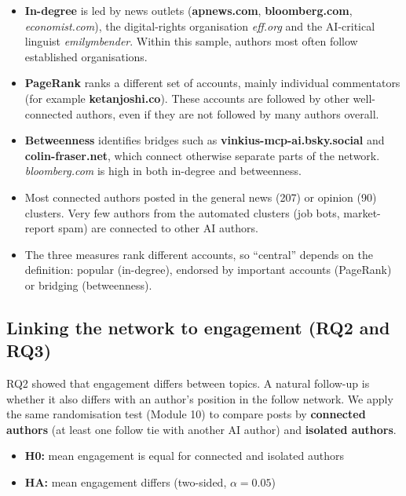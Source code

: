 \documentclass[
  10pt,
]{article}
\providecommand{\tightlist}{%
  \setlength{\itemsep}{0pt}\setlength{\parskip}{0pt}}
\begin{document}
\begin{itemize}
\tightlist
\item
  \textbf{In-degree} is led by news outlets (\textbf{apnews.com},
  \textbf{bloomberg.com}, \emph{economist.com}), the digital-rights
  organisation \emph{eff.org} and the AI-critical linguist
  \emph{emilymbender}. Within this sample, authors most often follow
  established organisations.
\item
  \textbf{PageRank} ranks a different set of accounts, mainly individual
  commentators (for example \textbf{ketanjoshi.co}). These accounts are
  followed by other well-connected authors, even if they are not
  followed by many authors overall.
\item
  \textbf{Betweenness} identifies bridges such as
  \textbf{vinkius-mcp-ai.bsky.social} and \textbf{colin-fraser.net},
  which connect otherwise separate parts of the network.
  \emph{bloomberg.com} is high in both in-degree and betweenness.
\item
  Most connected authors posted in the general news (207) or opinion
  (90) clusters. Very few authors from the automated clusters (job bots,
  market-report spam) are connected to other AI authors.
\item
  The three measures rank different accounts, so ``central'' depends on
  the definition: popular (in-degree), endorsed by important accounts
  (PageRank) or bridging (betweenness).
\end{itemize}

\subsection{Linking the network to engagement (RQ2 and
RQ3)}\label{linking-the-network-to-engagement-rq2-and-rq3}

RQ2 showed that engagement differs between topics. A natural follow-up
is whether it also differs with an author's position in the follow
network. We apply the same randomisation test (Module 10) to compare
posts by \textbf{connected authors} (at least one follow tie with
another AI author) and \textbf{isolated authors}.

\begin{itemize}
\tightlist
\item
  \textbf{H0:} mean engagement is equal for connected and isolated
  authors
\item
  \textbf{HA:} mean engagement differs (two-sided, \(\alpha = 0.05\))
\end{itemize}
\end{document}

